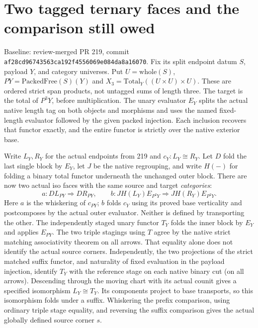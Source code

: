 \section*{Two tagged ternary faces and the comparison still owed}
Baseline: review-merged PR 219, commit
\texttt{af28cd96743563ca192f4556069e084da8a16070}. Fix its split endpoint
datum $S$, payload $Y$, and category universes. Put $U=\mathrm{whole}(S)$,
$P Y=\mathrm{PackedFree}(S)(Y)$ and $X_3=\mathrm{Total}_Y((U\times U)\times U)$.
These are ordered strict span products, not untagged sums of length three.
The target is the total of $P^3Y$, before multiplication.
The unary evaluator $E_Y$ splits the actual native length tag on both
objects and morphisms and uses the named fixed-length evaluator followed by
the given packed injection. Each inclusion recovers that functor exactly,
and the entire functor is strictly over the native exterior base.

Write $L_Y,R_Y$ for the actual endpoints from 219 and $c_Y:L_Y\cong R_Y$.
Let $D$ fold the last single block by $E_Y$, let $J$ be the native regrouping,
and write $H(-)$ for folding a binary total functor underneath the unchanged
outer block. There are now two actual iso faces with the same source and
target \emph{categories}:
\[
 a: D L_{P Y}\Rightarrow D R_{P Y},\qquad
 b: JH(L_Y)E_{P^2Y}\Rightarrow JH(R_Y)E_{P^2Y}.
\]
Here $a$ is the whiskering of $c_{P Y}$; $b$ folds $c_Y$ using its proved
base verticality and postcomposes by the actual outer evaluator. Neither
is defined by transporting the other. The independently staged unary
functor $T_Y$ folds the inner block by $E_Y$ and applies $E_{P Y}$.
The two triple stagings using $T$ agree by the native strict matching
associativity theorem on all arrows. That equality alone does not identify the actual source corners. Independently,
the two projections of the strict matched suffix functor, and naturality of
fixed evaluation in the payload injection, identify $T_Y$ with the reference
stage on each native binary cut (on all arrows). Descending through the
moving chart with its actual counit gives a specified isomorphism
$L_Y\cong T_Y$. Its components project to base transports, so this
isomorphism folds under a suffix. Whiskering the prefix comparison, using
ordinary triple stage equality, and reversing the suffix comparison gives
the actual globally defined source corner $s$.


